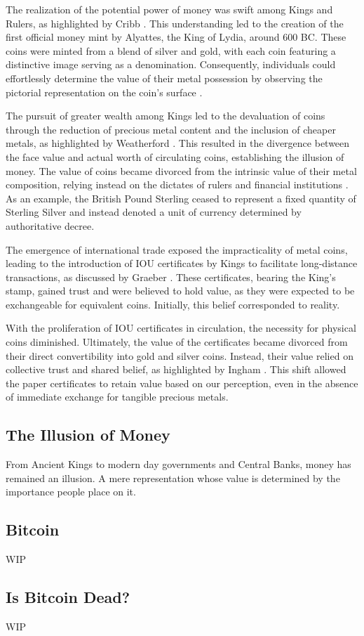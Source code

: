 The realization of the potential power of money was swift among Kings and Rulers, as highlighted by Cribb \cite{cribb1991}. This understanding led to the
creation of the first official money mint by Alyattes, the King of Lydia, around 600 BC. These coins were minted from a blend of silver and gold, with
each coin featuring a distinctive image serving as a denomination. Consequently, individuals could effortlessly determine the value of their metal
possession by observing the pictorial representation on the coin's surface \cite{deVries2008}.

The pursuit of greater wealth among Kings led to the devaluation of coins through the reduction of precious metal content and the inclusion of cheaper
metals, as highlighted by Weatherford \cite{weatherford1997}. This resulted in the divergence between the face value and actual worth of circulating
coins, establishing the illusion of money. The value of coins became divorced from the intrinsic value of their metal composition, relying instead on
the dictates of rulers and financial institutions \cite{ferguson2009}. As an example, the British Pound Sterling ceased to represent a fixed quantity
of Sterling Silver and instead denoted a unit of currency determined by authoritative decree.

The emergence of international trade exposed the impracticality of metal coins, leading to the introduction of IOU certificates by Kings to facilitate
long-distance transactions, as discussed by Graeber \cite{graeber2011}. These certificates, bearing the King's stamp, gained trust and were believed
to hold value, as they were expected to be exchangeable for equivalent coins. Initially, this belief corresponded to reality.

With the proliferation of IOU certificates in circulation, the necessity for physical coins diminished. Ultimately, the value of the certificates became
divorced from their direct convertibility into gold and silver coins. Instead, their value relied on collective trust and shared belief, as highlighted
by Ingham \cite{ingham2004}. This shift allowed the paper certificates to retain value based on our perception, even in the absence of immediate exchange
for tangible precious metals.

\subsection{The Illusion of Money}
From Ancient Kings to modern day governments and Central Banks, money has remained an illusion. A mere representation whose value is determined by
the importance people place on it.

\subsection{Bitcoin}
WIP

\subsection{Is Bitcoin Dead?}
WIP